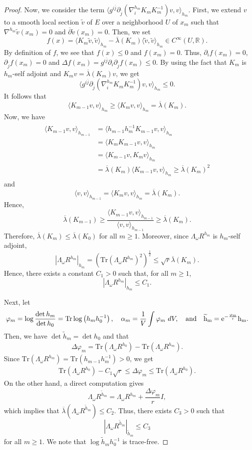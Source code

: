 \documentclass[11pt]{amsart}
\numberwithin{equation}{section}
\theoremstyle{remark}
\renewcommand{\bar}{\overline}
\newcommand{\pa}{\partial}
\renewcommand{\phi}{\varphi}
\newcommand{\wt}{\widetilde}
\newcommand{\R}{{\mathbb R}}
\newcommand{\lb}{\left (}
\newcommand{\rb}{\right )}
\newcommand{\ga}{\alpha}
\newcommand{\tr}{\text{Tr}}
\begin{document}
\begin{proof}
Now, we consider the term $ \langle g^{i\bar j}\pa_{\bar j}\lb \nabla_i^{h_m}K_m K_m^{-1} \rb v, v\rangle_{h_m}$. First, we extend $v$ to a smooth local section $\wt v$ of $E$ over a neighborhood $U$ of $x_m$ such that $\nabla^{h_m}\wt v(x_m)=0$ and $\bar\pa \wt v(x_m)=0$. Then, we set  \[f(x)=\langle K_m \wt v,\wt v\rangle_{h_m}-\bar\lambda\lb K_m\rb \langle \wt v,\wt v\rangle_{h_m} \in C^\infty \lb U,\R\rb.\] By definition of $f$, we see that $f(x)\leq 0$ and $f(x_m)=0$. Thus, $\pa_i f(x_m)=0$, $\pa_{\bar j} f(x_m)=0$ and $\Delta  f(x_m)=g^{i\bar j}\pa_i\pa_{\bar j}f(x_m)\leq 0$. By using the fact that $K_m$ is $h_m$-self adjoint and $K_m v=\bar\lambda\lb K_m\rb v$, we get
\[
\langle g^{i\bar j}\pa_{\bar j}\lb \nabla_i^{h_m}K_m K_m^{-1} \rb v, v\rangle_{h_m}\leq 0.
\]
It follows that
\[
\langle	K_{m-1}v,v\rangle_{h_m}\geq  \langle	K_{m}v,v\rangle_{h_m}=\bar\lambda\lb K_m\rb.
\]
Now, we have
\begin{align*}
	\begin{split}
\langle K_{m-1}v,v\rangle_{h_{m-1}} &=\langle h_{m-1}h_m^{-1} K_{m-1}v,v\rangle_{h_{m}}\\
& =\langle K_m K_{m-1}v,v\rangle_{h_{m}}  \\
&=\langle  K_{m-1}v,K_m v\rangle_{h_{m}} \\
& =\bar\lambda\lb K_m\rb \langle K_{m-1}v,v\rangle_{h_{m}}
\geq \bar\lambda\lb K_m\rb^2
\end{split}
\end{align*}
and
\[
\langle  v,v\rangle_{h_{m-1}}=\langle K_{m}v,v\rangle_{h_{m}}=\bar\lambda\lb K_m\rb.
\]
Hence,
\[
\bar\lambda\lb K_{m-1}\rb\geq \frac{\langle K_{m-1}v,v\rangle_{h_{m-1}}}{\langle  v,v\rangle_{h_{m-1}}}\geq \bar\lambda\lb K_m\rb.
\]
Therefore, $\bar\lambda\lb K_m\rb\leq \bar\lambda\lb K_0\rb$ for all $m\geq 1$.
Moreover, since $\Lambda_\omega R^{h_m}$ is $h_m$-self adjoint,
\[
\left |\Lambda_\omega R^{h_m}\right |_{h_m}=\lb \tr \lb \Lambda_\omega R^{h_m}\rb^2 \rb^{\frac 12}\leq \sqrt r \bar\lambda\lb K_m\rb.
\]
 Hence, there exists a constant $C_1>0$ such that, for all $m\geq 1$,
\[
\left |\Lambda_\omega R^{h_m}\right |_{h_m}\leq C_1.
\]


Next, let
\[
\phi_m=\log\frac{\det h_m}{\det h_0}=\tr\log \lb h_mh_0^{-1}\rb, \quad \ga_m=\frac 1V \int \phi_m\ dV, \quad \rm{and} \quad \wt h_m=e^{-\frac{\phi_m}{r}}h_m.
\]
Then, we have $\det \wt h_m=\det h_0$ and that
\begin{eqnarray}\label{400}
\Delta \phi_m=\tr \lb\Lambda_\omega R^{h_0}\rb-\tr \lb\Lambda_\omega R^{h_m}\rb.
\end{eqnarray}
Since $\tr \lb \Lambda_\omega R^{h_m}\rb=\tr \lb h_{m-1}h_m^{-1}\rb>0$, we get
\begin{eqnarray}\label{500}
\tr \lb \Lambda_\omega R^{h_0}\rb -C_1\sqrt r\leq\Delta\phi_m\leq \tr \lb\Lambda_\omega R^{h_0}\rb.
\end{eqnarray}
On the other hand, a direct computation gives
\[
\Lambda_\omega R^{\wt h_m}=\Lambda_\omega R^{h_m}+\frac{\Delta\phi_m}{r}I,
\]
which implies that $\bar\lambda \lb \Lambda_\omega R^{\wt h_m}\rb\leq C_2.$
Thus, there exists $C_3>0$ such that
\[\left |\Lambda_\omega R^{\wt h_m}\right |_{\wt h_m}\leq C_3\]
for all $m\geq 1$.
We note that $\log \wt h_mh_0^{-1}$ is trace-free.


\end{proof}
\end{document}
